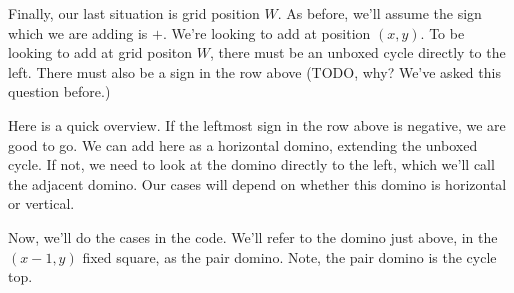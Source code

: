 \documentclass[12pt]{article}
\numberwithin{equation}{section}
\begin{document}
  Finally, our last situation is grid position $W$.
  As before, we'll assume the sign which we are adding is $+$.
  We're looking to add at position $(x, y)$.
  To be looking to add at grid positon $W$, there must be an unboxed cycle directly to the left.
  There must also be a sign in the row above (TODO, why?  We've asked this question before.)

  Here is a quick overview.
  If the leftmost sign in the row above is negative, we are good to go.
  We can add here as a horizontal domino, extending the unboxed cycle.
  If not, we need to look at the domino directly to the left, which we'll call the adjacent domino.
  Our cases will depend on whether this domino is horizontal or vertical.

  Now, we'll do the cases in the code.
  We'll refer to the domino just above, in the $(x - 1, y)$ fixed square, as the pair domino.
  Note, the pair domino is the cycle top.
\end{document}
